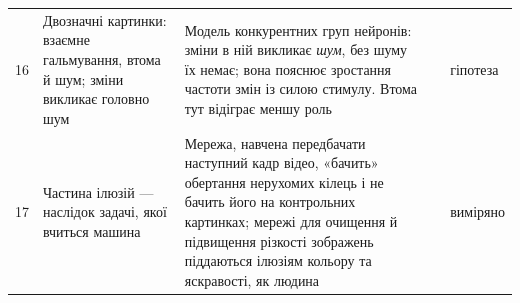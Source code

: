 {\begin{longtable}{>{\raggedright}p{0.5cm}>{\raggedright}p{4.0cm}>{\raggedright}p{5.6cm}>{\raggedright}p{2.3cm}>{\raggedright\arraybackslash}p{1.7cm}}
16 & Двозначні картинки: взаємне гальмування, втома й шум; зміни викликає головно шум & Модель конкурентних груп нейронів: зміни в ній викликає \emph{шум}, без шуму їх немає; вона пояснює зростання частоти змін із силою стимулу. Втома тут відіграє меншу роль & \cite{MorenoBote2007} & гіпотеза \\
17 & Частина ілюзій --- наслідок задачі, якої вчиться машина & Мережа, навчена передбачати наступний кадр відео, «бачить» обертання нерухомих кілець і не бачить його на контрольних картинках; мережі для очищення й підвищення різкості зображень піддаються ілюзіям кольору та яскравості, як людина & \cite{Watanabe2018,GomezVilla2020} & виміряно \\
\bottomrule
\end{longtable}}
